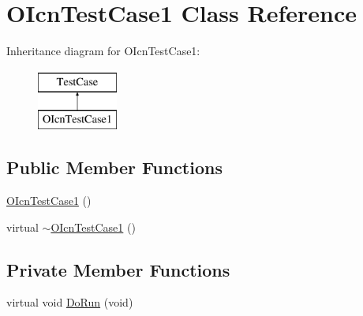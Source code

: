 \hypertarget{classOIcnTestCase1}{\section{O\-Icn\-Test\-Case1 Class Reference}
\label{classOIcnTestCase1}
}
Inheritance diagram for O\-Icn\-Test\-Case1\-:\begin{figure}[H]
\begin{center}
\leavevmode
\includegraphics[height=2.000000cm]{classOIcnTestCase1}
\end{center}
\end{figure}
\subsection*{Public Member Functions}
\begin{DoxyCompactItemize}
\item 
\hyperlink{classOIcnTestCase1_aa0896d0862938fa8d3c95a0a2f9975c5}{O\-Icn\-Test\-Case1} ()
\item 
virtual \hyperlink{classOIcnTestCase1_add5c4dc2b17a29935529fc70466e2831}{$\sim$\-O\-Icn\-Test\-Case1} ()
\end{DoxyCompactItemize}
\subsection*{Private Member Functions}
\begin{DoxyCompactItemize}
\item 
virtual void \hyperlink{classOIcnTestCase1_af4aeea901fc4edf5f3efb357bf890154}{Do\-Run} (void)
\end{DoxyCompactItemize}


